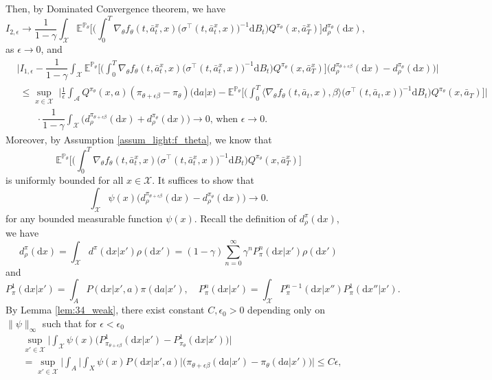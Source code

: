 \documentclass{article}
\newcommand{\1}{\mathbbm{1}}
\numberwithin{equation}{section}
\def\to{\rightarrow}
\def\cA{\mathcal{A}}
\def\cX{\mathcal{X}}
\def\d{{\mathrm{d}}}
\def\sE{{\mathbb{E}}}
\def\sP{\mathbb{P}}
\begin{document}
Then, by Dominated Convergence theorem, we have
$$
I_{2,\epsilon}\to \dfrac{1}{1-\gamma}\int_\cX\sE^{\sP_\theta}\bigg[\bigg(\int_0^T{\nabla_\theta f_\theta(t,\bar a_t^x,x)}\big(\sigma^\top(t,\bar{a}^x_t,x)\big)^{-1}\d B_t\bigg)Q^{\pi_{\theta}} (x,\bar a_T^x)
   \bigg]d_\rho^{\pi_\theta} (\d x),
$$
as $\epsilon\to 0$, and 
\begin{align*}
    &\Bigg|I_{1,\epsilon}-\dfrac{1}{1-\gamma}\int_\cX\sE^{\sP_\theta}\bigg[\bigg(\int_0^T{\nabla_\theta f_\theta(t,\bar a_t^x,x)}\big(\sigma^\top(t,\bar{a}^x_t,x)\big)^{-1}\d B_t\bigg)Q^{\pi_{\theta}} (x,\bar a_T^x)
   \bigg]\Big(d_\rho^{\pi_{\theta+\epsilon\beta}} (\d x)-d_\rho^{\pi_{\theta}} (\d x)\Big)\Bigg|
   \\
   &\;\leq \sup_{x\in\mathcal{X}}\;\Bigg|\frac1{\epsilon}\int_\cA Q^{\pi_{\theta}} (x,a)
  (\pi_{\theta+\epsilon \beta}-\pi_{\theta})\big(\d a\big|x\big)-\sE^{\sP_\theta}\bigg[\bigg(\int_0^T{\langle\nabla_\theta f_\theta(t,\bar a_t,x),\beta\rangle}\big(\sigma^\top(t,\bar a_t,x)\big)^{-1}\d B_t\bigg)Q^{\pi_{\theta}} (x,\bar a_T)\bigg]\Bigg|
  \\
  &\qquad\cdot\dfrac{1}{1-\gamma}\int_\cX\Big(d_\rho^{\pi_{\theta+\epsilon\beta}} (\d x)+d_\rho^{\pi_{\theta}} (\d x)\Big)\to 0\text{, when }\epsilon\to 0.
\end{align*}
Moreover, by Assumption \eqref{assum_light:f_theta}, we know that 
$$
\sE^{\sP_\theta}\bigg[\bigg(\int_0^T{\nabla_\theta f_\theta(t,\bar a_t^x,x)}\big(\sigma^\top(t,\bar{a}^x_t,x)\big)^{-1}\d B_t\bigg)Q^{\pi_{\theta}} (x,\bar a_T^x)
   \bigg]
$$
is uniformly bounded for all $x\in\mathcal X$. It suffices to show that 
$$
\int_\mathcal{X}\psi(x)\big(d_\rho^{\pi_{\theta+\epsilon\beta}} (\d x)-d_\rho^{\pi_{\theta}} (\d x)\big)\to 0.
$$
for any bounded measurable function $\psi(x)$. Recall the definition of $d_\rho^\pi(\d x)$, we have
$$
d_\rho^\pi(\d x)=\int_\mathcal{X}d^\pi(\d x|x')\rho(\d x')=(1-\gamma)\sum_{n=0}^\infty\gamma^n P_{\pi}^n(\d x|x')\rho(\d x')
$$
and 
$$
P_\pi^1(\d x|x')=\int_AP(\d x|x',a)\pi(\d a|x'),\quad P_\pi^n(\d x|x')=\int_\mathcal{X}P_\pi^{n-1}(\d x|x'')P_\pi^1(\d x''|x').
$$
By Lemma \ref{lem:34_weak}, there exist constant $C,\epsilon_0>0$ depending only on $\|\psi\|_\infty$ such that for $\epsilon<\epsilon_0$
\begin{align*}
&\sup_{x'\in\mathcal{X}}\bigg|\int_{\mathcal{X}}\psi(x)\big(P_{\pi_{\theta+\epsilon\beta}}^1(\d x|x')-P_{\pi_\theta}^1(\d x|x')\big)\bigg|
\\
&=\sup_{x'\in\mathcal{X}}\Bigg|\int_A\bigg|\int_X\psi(x)P(\d x|x',a)\bigg|\big({\pi_{\theta+\epsilon\beta}}(\d a|x')-\pi_\theta(\d a|x')\big)\Bigg|
\leq C\epsilon, 
\end{align*}
\end{document}
